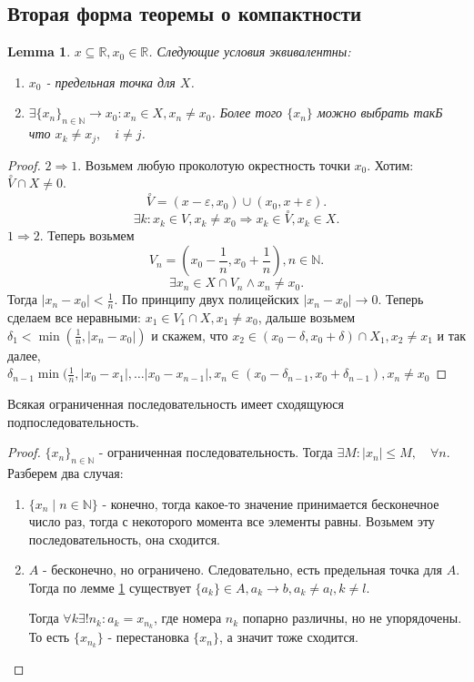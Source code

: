\documentclass[11pt]{book}
\newcommand{\N}{\mathbb{N}}
\newcommand{\R}{\mathbb{R}}
\newcommand{\pivi}{\stackrel \circ }
\renewcommand{\le}{\leqslant}
\theoremstyle{definition}
\theoremstyle{plain}
\theoremstyle{plain}
\newtheorem*{lm}{Lemma}
\theoremstyle{definition}
\theoremstyle{remark}
\begin{document}
\subsection{Вторая форма теоремы о компактности}\label{ques_35}
\begin{lm}\label{lm_for_the_second_form_of_the_theorm_of_compact}
    $x \subseteq \R, x_0 \in  \R$. Следующие условия эквивалентны: $ $
    \begin{enumerate}
        \item $x_0$ - предельная точка для $X$.
	\item $\exists \{x_n\}_{n \in \N} \to x_0 : x_n \in  X, x_n \ne x_0$. Более того $\{x_n\}$ можно выбрать такБ что $x_k \ne x_j, \quad i\ne j$.
    \end{enumerate}
\end{lm}
\begin{proof}
    $2 \Rightarrow  1$.
    Возьмем любую проколотую окрестность точки $x_0$. Хотим:  $\pivi V \cap X \ne 0$.\[
	\pivi V = (x -\varepsilon , x_0) \cup (x_0, x+ \varepsilon )
    .\] 
     \[
    \exists k : x_k \in  V, x_k \ne x_0 \Rightarrow x_k \in  \pivi V, x_k \in  X
    .\] 
    $1 \Rightarrow 2$.
    Теперь возьмем 
     \[
	 V_n = (x_0 -\frac{1}{n}, x_0 + \frac{1}{n}), n \in  \N
    .\] 
    \[
	\exists x_n \in  X \cap V_n \wedge x_n \ne x_0
    .\] 
    Тогда $|x_n - x_0| < \frac{1}{n}$. По принципу двух полицейских $|x_n - x_0| \to  0$.
    Теперь сделаем все неравными:
    $x_1 \in  V_1 \cap X, x_1 \ne x_0$, дальше возьмем $\delta_1  < \min (\frac{1}{n} , |x_n - x_0|)$ и скажем, что $x_2 \in  (x_0 - \delta , x_0 + \delta ) \cap X_1, x_2 \ne x_1$ и так далее, $\delta_{n-1} \min (\frac{1}{n}, |x_0 -x_1|, \ldots |x_0 - x_{n-1}|, x_n \in  (x_0 - \delta _{n-1}, x_0 + \delta_{n-1}), x_n \ne x_0 $
\end{proof}
\begin{thm}
    Всякая ограниченная последовательность имеет сходящуюся подпоследовательность.
\end{thm}
\begin{proof}
    $\{x_n\}_{n \in \N}$ - ограниченная последовательность. Тогда $\exists M: |x_n| \le M, \quad \forall n$. Разберем два случая:
    $ $
    \begin{enumerate}
        \item $\{x_n \mid n \in  \N\}$ - конечно, тогда какое-то значение принимается бесконечное число раз, тогда с некоторого момента все элементы равны. Возьмем эту последовательность, она сходится.
	\item $A$ - бесконечно, но ограничено. Следовательно, есть предельная точка для $A$.
	    Тогда по лемме \ref{lm_for_the_second_form_of_the_theorm_of_compact} существует $\{a_k\} \in  A, a_k \to  b,  a_k \ne a_l , k \ne l$.

	    Тогда $\forall k \exists ! n_k: a_k=x_{n_k}$, где номера $n_k$ попарно различны, но не упорядочены. То есть $\{x_{n_k}\}$ - перестановка $\{x_n\}$, а значит тоже сходится.
    \end{enumerate}
\end{proof}
\end{document}
